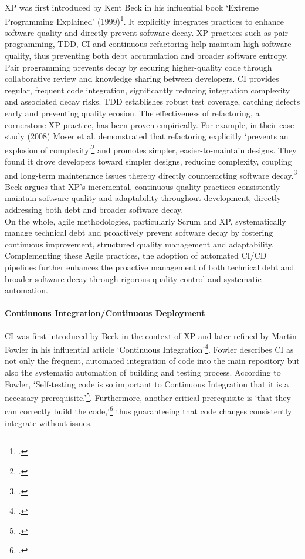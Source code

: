 \ac{XP} was first introduced by Kent Beck in his influential book `Extreme Programming Explained' (1999)\footcite{beckExtremeProgrammingExplained1999}.
It explicitly integrates practices to enhance software quality and directly prevent software decay.
\ac{XP} practices such as pair programming, \ac{TDD}, \ac{CI} and continuous refactoring help maintain high software quality, thus preventing both debt accumulation
and broader software entropy.
Pair programming prevents decay by securing higher-quality code through collaborative review and knowledge sharing between developers.
\ac{CI} provides regular, frequent code integration, significantly reducing integration complexity and associated decay risks.
\ac{TDD} establishes robust test coverage, catching defects early and preventing quality erosion.
The effectiveness of refactoring, a cornerstone XP practice, has been proven empirically. For example, in their case study (2008) Moser et al.
demonstrated that refactoring explicitly `prevents an explosion of complexity'\footcite[262]{moserCaseStudyImpact2008}
and promotes simpler, easier-to-maintain designs.
They found it drove developers toward simpler designs, reducing complexity, coupling and long-term maintenance issues thereby directly counteracting software decay.\footcite[262]{moserCaseStudyImpact2008}
Beck argues that \ac{XP}'s incremental, continuous quality practices consistently maintain software quality and adaptability throughout development, directly addressing both debt and broader software decay.\\
On the whole, agile methodologies, particularly Scrum and \ac{XP}, systematically manage technical debt and proactively prevent software decay by fostering continuous improvement, structured quality management and adaptability.
Complementing these Agile practices, the adoption of automated \ac{CI/CD} pipelines further enhances the proactive management of both technical debt
and broader software decay through rigorous quality control and systematic automation.\\

\paragraph{Continuous Integration/Continuous Deployment}
\ac{CI} was first introduced by Beck in the context of \ac{XP} and later refined by Martin Fowler in his influential article `Continuous Integration'\footcite{fowlerContinuousIntegration2006}.
Fowler describes \ac{CI} as not only the frequent, automated integration of code into the main repository but also the systematic automation of building and testing process.
According to Fowler, `Self-testing code is so important to Continuous Integration that it is a necessary prerequisite.'\footcite{fowlerContinuousIntegration2006}.
Furthermore, another critical prerequisite is `that they can correctly build the code,'\footcite{fowlerContinuousIntegration2006} thus guaranteeing that code changes consistently
integrate without issues.\\

